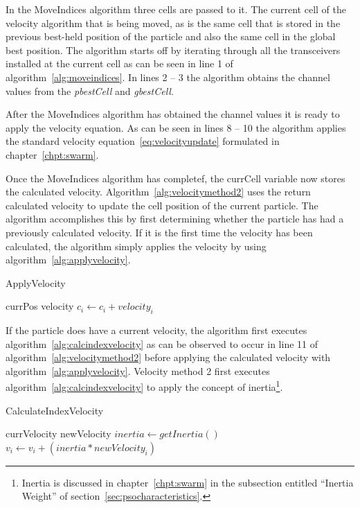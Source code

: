 In the MoveIndices algorithm three cells are passed to it. The current cell of the velocity algorithm that is being moved, as is the same cell that is stored in the previous best-held position of the particle and also the same cell in the global best position. The algorithm starts off by iterating through all the transceivers installed at the current cell as can be seen in line 1 of algorithm~\ref{alg:moveindices}. In lines 2 -- 3 the algorithm obtains the channel values from the \emph{pbestCell} and \emph{gbestCell}.

After the MoveIndices algorithm has obtained the channel values it is ready to apply the velocity equation. As can be seen in lines 8 -- 10 the algorithm applies the standard velocity equation~\ref{eq:velocityupdate} formulated in chapter~\ref{chpt:swarm}. 

Once the MoveIndices algorithm has completef, the currCell variable now stores the calculated velocity. Algorithm~\ref{alg:velocitymethod2} uses the return calculated velocity to update the cell position of the current particle. The algorithm accomplishes this by first determining whether the particle has had a previously calculated velocity. If it is the first time the velocity has been calculated, the algorithm simply applies the velocity by using algorithm~\ref{alg:applyvelocity}. 

\begin{algorithm}
\caption{ApplyVelocity}
\label{alg:applyvelocity}
\begin{algorithmic}[1]
	\Require currPos
	\Require velocity
		\State $c_i \leftarrow c_i + velocity_i$
	\EndFor
\end{algorithmic}
\end{algorithm}

If the particle does have a current velocity, the algorithm first executes algorithm~\ref{alg:calcindexvelocity} as can be observed to occur in line 11 of algorithm~\ref{alg:velocitymethod2} before applying the calculated velocity with algorithm~\ref{alg:applyvelocity}. Velocity method 2 first executes algorithm~\ref{alg:calcindexvelocity} to apply the concept of inertia\footnote{Inertia is discussed in chapter~\ref{chpt:swarm} in the subsection entitled ``Inertia Weight'' of section~\ref{sec:psocharacteristics}.}.

\begin{algorithm}
\caption{CalculateIndexVelocity}
\label{alg:calcindexvelocity}
\begin{algorithmic}[1]
	\Require currVelocity
	\Require newVelocity
		\State $inertia \leftarrow getInertia()$
		\State $v_i \leftarrow v_i + (inertia * newVelocity_i)$
	\EndFor
\end{algorithmic}
\end{algorithm}

